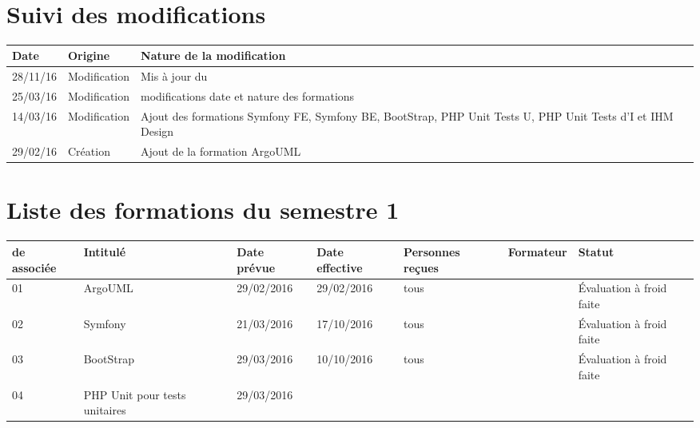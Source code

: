 \documentclass[asi,sansVersion]{picInsa}
\begin{document}
	\begin{center}
		\LARGE
		\textsc{
			\PF{}\\
		}
	\end{center}
	\vspace{0.5cm}

	\section*{Suivi des modifications}
	\begin{table}[H]
		\centering
		\begin{tabularx}{18cm}{|p{1.7cm}|p{4cm}|X|}
		\hline
		\rowcolor[gray]{0.85} Date & Origine & Nature de la modification\\\hline
		28/11/16 & Modification & Mis à jour du \PF \\ \hline
		25/03/16 & Modification & modifications date et nature des formations \\ \hline
		14/03/16 & Modification & Ajout des formations Symfony FE, Symfony BE, BootStrap, PHP Unit Tests U, PHP Unit Tests d'I et IHM Design \\ \hline
		29/02/16 & Création & Ajout de la formation ArgoUML\\ \hline
		
		\end{tabularx}
	\end{table}
	
	\section*{Liste des formations du semestre 1}
		\begin{longtable}{|p{2cm}|p{3.5cm}|p{2cm}|p{2cm}|p{2cm}|c|p{2cm}|}
			\hline
			\rowcolor{gris2}
			\No{} de \FFCourt{} associée & Intitulé & Date prévue & Date effective & Personnes reçues & Formateur & Statut \\\hline
			01 & ArgoUML & 29/02/2016 & 29/02/2016 & tous & \Julie{} & Évaluation à froid faite \\\hline
			02 & Symfony & 21/03/2016 & 17/10/2016 & tous & \Florian{} & Évaluation à froid faite \\\hline
			03 & BootStrap & 29/03/2016 & 10/10/2016 & tous & \Matthieu{} & Évaluation à froid faite\\\hline
			04 & PHP Unit pour tests unitaires & 29/03/2016 &  &  &  & \\\hline
		\end{longtable}
\end{document}
